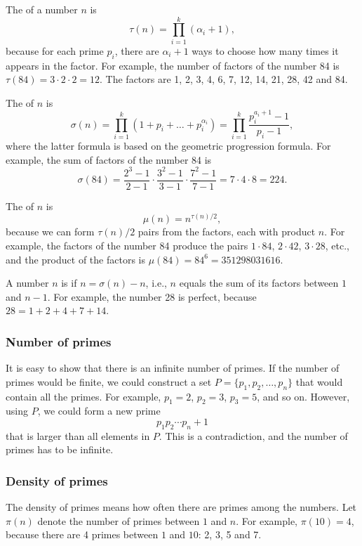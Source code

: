 The  of a number $n$ is
\[\tau(n)=\prod_{i=1}^k (\alpha_i+1),\]
because for each prime $p_i$, there are
$\alpha_i+1$ ways to choose how many times
it appears in the factor.
For example, the number of factors
of the number 84 is
$\tau(84)=3 \cdot 2 \cdot 2 = 12$.
The factors are
1, 2, 3, 4, 6, 7, 12, 14, 21, 28, 42 and 84.

The  of $n$ is
\[\sigma(n)=\prod_{i=1}^k (1+p_i+\ldots+p_i^{\alpha_i}) = \prod_{i=1}^k \frac{p_i^{a_i+1}-1}{p_i-1},\]
where the latter formula is based on the geometric progression formula.
For example, the sum of factors of the number 84 is
\[\sigma(84)=\frac{2^3-1}{2-1} \cdot \frac{3^2-1}{3-1} \cdot \frac{7^2-1}{7-1} = 7 \cdot 4 \cdot 8 = 224.\]

The  of $n$ is
\[\mu(n)=n^{\tau(n)/2},\]
because we can form $\tau(n)/2$ pairs from the factors,
each with product $n$.
For example, the factors of the number 84
produce the pairs
$1 \cdot 84$, $2 \cdot 42$, $3 \cdot 28$, etc.,
and the product of the factors is $\mu(84)=84^6=351298031616$.


A number $n$ is  if $n=\sigma(n)-n$,
i.e., $n$ equals the sum of its factors
between $1$ and $n-1$.
For example, the number 28 is perfect,
because $28=1+2+4+7+14$.

\subsubsection{Number of primes}

It is easy to show that there is an infinite number
of primes.
If the number of primes would be finite,
we could construct a set $P=\{p_1,p_2,\ldots,p_n\}$
that would contain all the primes.
For example, $p_1=2$, $p_2=3$, $p_3=5$, and so on.
However, using $P$, we could form a new prime
\[p_1 p_2 \cdots p_n+1\]
that is larger than all elements in $P$.
This is a contradiction, and the number of primes
has to be infinite.

\subsubsection{Density of primes}

The density of primes means how often there are primes
among the numbers.
Let $\pi(n)$ denote the number of primes between
$1$ and $n$. For example, $\pi(10)=4$, because
there are 4 primes between $1$ and $10$: 2, 3, 5 and 7.

